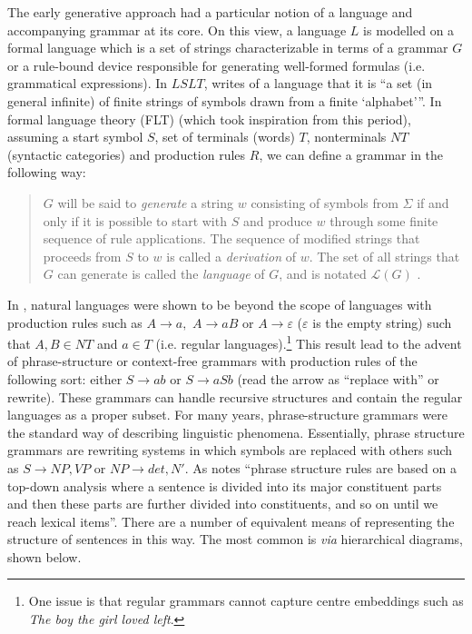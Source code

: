 \documentclass[output=paper]{langscibook}
\begin{document}
The early generative approach had a particular notion of a language and accompanying grammar at its core. On this view, a language $L$ is modelled on a formal language which is a set of strings characterizable in terms of a grammar $G$ or a rule-bound device responsible for generating well-formed formulas (i.e. grammatical expressions). In $LSLT$, \cite[5]{Chomsky1975} writes of a language that it is ``a set (in general infinite) of finite strings of symbols drawn from a finite `alphabet'\thinspace''. In formal language theory (FLT) (which took inspiration from this period), assuming a start symbol $S$, set of terminals (words) $T$, nonterminals $NT$ (syntactic categories) and production rules $R$, we can define a grammar in the following way:

\begin{quote}
$G$ will be said to \emph{generate} a string $w$ consisting of symbols from $\Sigma$ if and only if it is possible to start with $S$ and produce $w$ through some finite sequence of rule applications. The sequence of modified strings that proceeds from $S$ to $w$ is called a \emph{derivation} of $w$. The set of all strings that $G$ can generate is called the \emph{language} of $G$, and is notated $\mathcal{L}(G)$ \citep[1957]{Jager2012}. 
\end{quote}

In \cite{Chomsky1956}, natural languages were shown to be beyond the scope of languages with production rules such as $A\rightarrow a,$ $A\rightarrow aB$
or $A\rightarrow\varepsilon$ ($\varepsilon$ is the empty string)
such that $A,B\in NT$ and $a\in T$ (i.e. regular languages).\footnote{One issue is that regular grammars cannot capture centre embeddings such as \emph{The boy the girl loved left}.} This result lead to the advent of phrase-structure or context-free grammars with production rules of the following sort: either $S\rightarrow ab$ or $S\rightarrow aSb$ (read the arrow as ``replace with'' or rewrite). These grammars can handle recursive structures and contain the regular languages as a proper subset. For many years, phrase-structure grammars were the standard way of describing linguistic phenomena. Essentially, phrase structure grammars are rewriting systems in which symbols are replaced with others such as $S\rightarrow NP, VP$ or $NP\rightarrow det, N'$. As \citet[897]{Freidin2012} notes ``phrase structure rules are based on a top-down analysis where a sentence is divided into its major constituent parts and then these parts are further divided into constituents, and so on until we reach lexical items''. There are a number of equivalent means of representing the structure of sentences in this way. The most common is \emph{via} hierarchical diagrams, shown below. 
\end{document}
